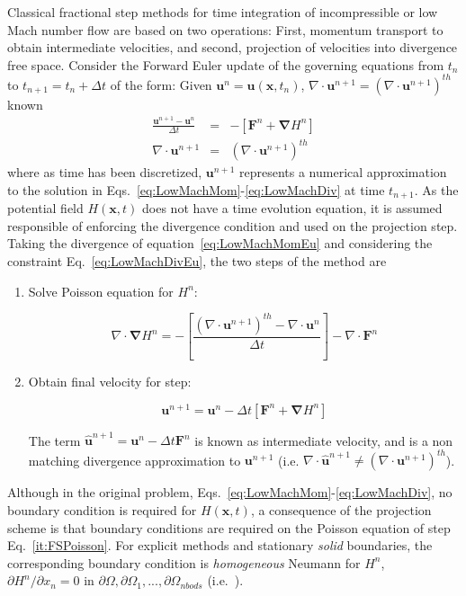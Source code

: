 Classical fractional step methods for time integration of incompressible or low Mach number flow are based on two operations: First, momentum transport to obtain intermediate velocities, and second, projection of velocities into divergence free space. Consider the Forward Euler update of the governing equations from $t_n$ to $t_{n+1}=t_n + \Delta t$ of the form: Given $ \mathbf{u}^n=\mathbf{u}(\mathbf{x},t_n)$, $\nabla \cdot \mathbf{u}^{n+1} = \left( \nabla \cdot \mathbf{u}^{n+1} \right)^{th}$ known
%
\begin{eqnarray}
  \frac{\mathbf{u}^{n+1}-\mathbf{u}^{n}}{\Delta t} &=& - \left[ \mathbf{F}^n +  \boldsymbol{\nabla} H^n \right] \label{eq:LowMachMomEu}\\
  \nabla \cdot \mathbf{u}^{n+1} &=& \left( \nabla \cdot \mathbf{u}^{n+1} \right)^{th} \label{eq:LowMachDivEu}
\end{eqnarray}
%
where as time has been discretized, $\mathbf{u}^{n+1}$ represents a numerical approximation to the solution in Eqs.~\eqref{eq:LowMachMom}-\eqref{eq:LowMachDiv} at time $t_{n+1}$. As the potential field $H(\mathbf{x},t)$ does not have a time evolution equation, it is assumed responsible of enforcing the divergence condition and used on the projection step. Taking the divergence of equation~\eqref{eq:LowMachMomEu} and considering  the constraint Eq.~\eqref{eq:LowMachDivEu}, the two steps of the method are
%
\begin{enumerate}
  \item Solve Poisson equation for $H^n$:

\begin{equation}
   \nabla \cdot \boldsymbol{\nabla} H^n = - \left[ \frac{\left( \nabla \cdot \mathbf{u}^{n+1} \right)^{th} - \nabla \cdot \mathbf{u}^{n}}{\Delta t} \right] - \nabla \cdot \mathbf{F}^n \label{it:FSPoisson}
\end{equation}

  \item Obtain final velocity for step:

  \begin{equation}
     \mathbf{u}^{n+1} = \mathbf{u}^{n} - \Delta t \left[ \mathbf{F}^n +  \boldsymbol{\nabla} H^n \right] \label{it:FSProject}
   \end{equation}

   The term $\hat{\mathbf{u}}^{n+1}=\mathbf{u}^{n} - \Delta t \mathbf{F}^n$ is known as intermediate velocity, and is a non matching divergence approximation to $\mathbf{u}^{n+1}$ (i.e. $\nabla \cdot \hat{\mathbf{u}}^{n+1} \neq \left( \nabla \cdot \mathbf{u}^{n+1} \right)^{th}$).
\end{enumerate}
%
Although in the original problem, Eqs.~\eqref{eq:LowMachMom}-\eqref{eq:LowMachDiv}, no boundary condition is required for $H(\mathbf{x},t)$, a consequence of the projection scheme is that boundary conditions are required on the Poisson equation of step Eq.~\eqref{it:FSPoisson}. For explicit methods and stationary \textit{solid} boundaries, the corresponding boundary condition is \textit{homogeneous} Neumann for $H^n$, $\partial H^n / \partial x_n =0$ in $\partial \Omega,\partial \Omega_1,...,\partial \Omega_{nbods}$ (i.e.~\cite{Perot:1993}).


